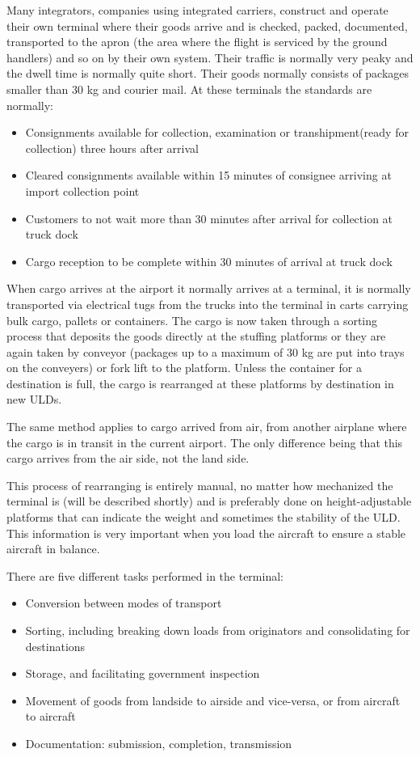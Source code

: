 Many integrators, companies using integrated carriers, construct and operate their own terminal where their goods arrive and is checked, packed, documented, transported to the apron (the area where the flight is serviced by the ground handlers) and so on by their own system. 
Their traffic is normally very peaky and the dwell time is normally quite short. Their goods normally consists of packages smaller than 30 kg and courier mail. At these terminals the standards are normally:
\begin{itemize}
\item Consignments available for collection, examination or transhipment(ready for collection) three hours after arrival
\item Cleared consignments available within 15 minutes of consignee arriving at import collection point
\item Customers to not wait more than 30 minutes after arrival for collection at truck dock
\item Cargo reception to be complete within 30 minutes of arrival at truck dock
\end{itemize}

When cargo arrives at the airport it normally arrives at a terminal, it is normally transported via electrical tugs from the trucks into the terminal in carts carrying bulk cargo, pallets or containers. The cargo is now taken through a sorting process that deposits the goods directly at the stuffing platforms or they are again taken by conveyor (packages up to a maximum of 30 kg are put into trays on the conveyers) or fork lift to the platform.
Unless the container for a destination is full, the cargo is rearranged at these platforms by destination in new ULDs.


The same method applies to cargo arrived from air, from another airplane where the cargo is in transit in the current airport. The only difference being that this cargo arrives from the air side, not the land side.

This process of rearranging is entirely manual, no matter how mechanized the terminal is (will be described shortly) and is preferably done on height-adjustable platforms that can indicate the weight and sometimes the stability of the ULD. This information is very important when you load the aircraft to ensure a stable aircraft in balance.


There are five different tasks performed in the terminal:
\begin{itemize}
\item Conversion between modes of transport
\item Sorting, including breaking down loads from originators and consolidating for destinations
\item Storage, and facilitating government inspection
\item Movement of goods from landside to airside and vice-versa, or from aircraft to aircraft
\item Documentation: submission, completion, transmission
\end{itemize}

